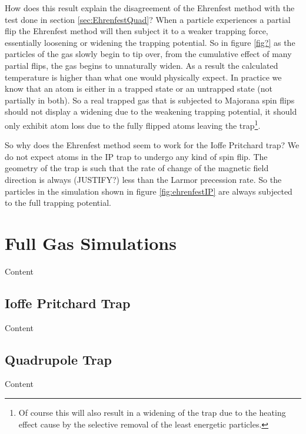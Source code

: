 How does this result explain the disagreement of the Ehrenfest method with the test done in section \ref{sec:EhrenfestQuad}?
When a particle experiences a partial flip the Ehrenfest method will then subject it to a weaker trapping force, essentially loosening or widening the trapping potential.
So in figure \ref{fig?} as the particles of the gas slowly begin to tip over, from the cumulative effect of many partial flips, the gas begins to unnaturally widen.
As a result the calculated temperature is higher than what one would physically expect.
In practice we know that an atom is either in a trapped state or an untrapped state (not partially in both).
So a real trapped gas that is subjected to Majorana spin flips should not display a widening due to the weakening trapping potential, it should only exhibit atom loss due to the fully flipped atoms leaving the trap\footnote{Of course this will also result in a widening of the trap due to the heating effect cause by the selective removal of the least energetic particles.}.

So why does the Ehrenfest method seem to work for the Ioffe Pritchard trap?
We do not expect atoms in the IP trap to undergo any kind of spin flip.
The geometry of the trap is such that the rate of change of the magnetic field direction is always (JUSTIFY?) less than the Larmor precession rate.
So the particles in the simulation shown in figure \ref{fig:ehrenfestIP} are always subjected to the full trapping potential.


\section{Full Gas Simulations}

Content


\subsection{Ioffe Pritchard Trap}

Content


\subsection{Quadrupole Trap}

Content